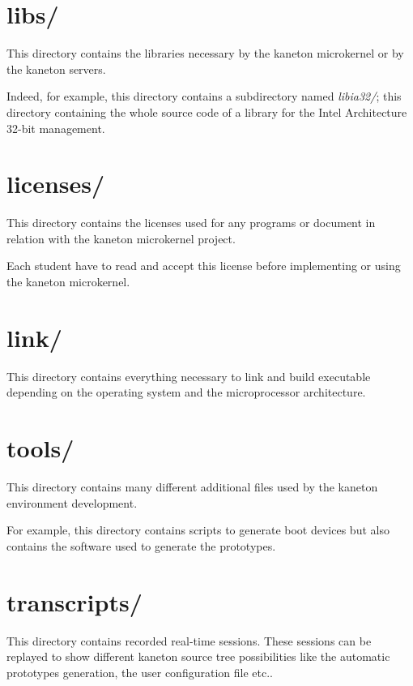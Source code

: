%
%

\section{libs/}

This directory contains the libraries necessary by the kaneton microkernel
or by the kaneton servers.

Indeed, for example, this directory contains a subdirectory named
\textit{libia32/}; this directory containing the whole source code of
a library for the Intel Architecture 32-bit management.

%
%

\section{licenses/}

This directory contains the licenses used for any programs or document
in relation with the kaneton microkernel project.

Each student have to read and accept this license before implementing
or using the kaneton microkernel.

%
%

\section{link/}

This directory contains everything necessary to link and build
executable depending on the operating system and the microprocessor
architecture.

%
%

\section{tools/}

This directory contains many different additional files used by
the kaneton environment development.

For example, this directory contains scripts to generate boot devices
but also contains the software used to generate the prototypes.

%
%

\section{transcripts/}

This directory contains recorded real-time sessions. These sessions
can be replayed to show different kaneton source tree possibilities
like the automatic prototypes generation, the user configuration file
etc..

